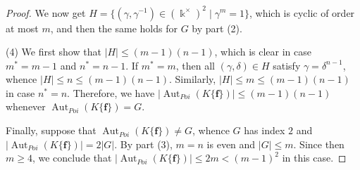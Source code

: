 \documentclass[10pt,a4paper]{amsart}
\DeclareMathOperator{\Aut}{Aut}
\newcommand \bff {{\mathbf{f}}}
\newcommand \kx {\Bbbk^\times}
\begin{document}
\begin{proof}
We now get $H = \{ (\gamma,\gamma^{-1}) \in (\kx)^2 \mid \gamma^m = 1 \}$, which is cyclic of order at most $m$, and then the same holds for $G$ by part (2).

(4)  We first show that $|H| \le (m-1)(n-1)$, which is clear in case $m^* = m-1$ and $n^* = n-1$.
If $m^* = m$, then all $(\gamma,\delta) \in H$ satisfy $\gamma = \delta^{n-1}$, whence $|H| \le n \le (m-1)(n-1)$.  Similarly, $|H| \le m \le (m-1)(n-1)$ in case $n^* = n$.  Therefore, we have $|{\Aut_{Poi}}(K\{\bff\})| \le (m-1)(n-1)$ whenever $\Aut_{Poi}(K\{\bff\}) = G$.

Finally, suppose that $\Aut_{Poi}(K\{\bff\}) \ne G$, whence $G$ has index $2$ and $|{\Aut_{Poi}}(K\{\bff\})| = 2 |G|$.  By part (3), $m=n$ is even and $|G| \le m$.  Since then $m \ge 4$, we conclude that $|{\Aut_{Poi}}(K\{\bff\})| \le 2m < (m-1)^2$ in this case.
\end{proof}
\end{document}
